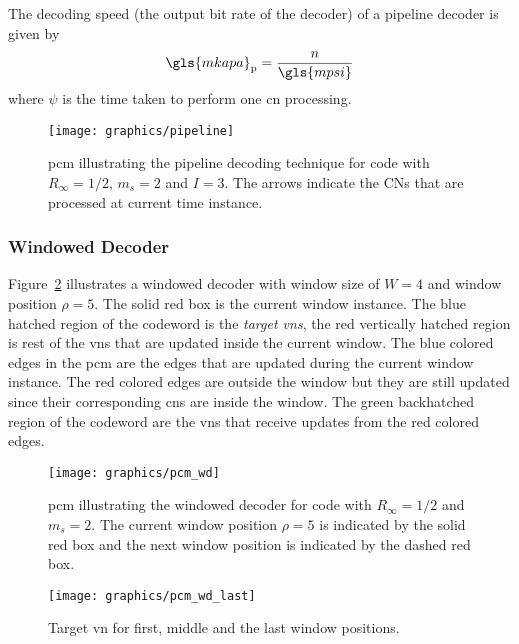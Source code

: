 The decoding speed (the output bit rate of the decoder) of a pipeline decoder is given by
\begin{align}
\gls{mkapa}_{\text{p}}=\frac{n}{\gls{mpsi}}
\end{align}
where $\psi$ is the time taken to perform one \gls{cn} processing.

\begin{figure}[htbp]
  \centering
  \texttt{[image: graphics/pipeline]}
  \caption[Illustration of Pipeline decoder.]{\gls{pcm} illustrating the pipeline decoding technique for code with $R_\infty=1/2$, $m_s=2$ and $I=3$. The arrows indicate the CNs that are processed at current time instance.}
  \label{fig:pipeline}
\end{figure}

\subsubsection{Windowed Decoder}\label{sec:back_wd}
Figure~\ref{fig:wd} illustrates a windowed decoder with window size of $W=4$ and window position $\rho=5$. The solid red box is the current window instance. The blue hatched region of the codeword is the \emph{target \glspl{vn}}, the red vertically hatched region is rest of the \glspl{vn} that are updated inside the current window. The blue colored edges in the \gls{pcm} are the edges that are updated during the current window instance. The red colored edges are outside the window but they are still updated since their corresponding \glspl{cn} are inside the window. The green backhatched region of the codeword are the \glspl{vn} that receive updates from the red colored edges.
\begin{figure}[htbp]
  \centering
  \texttt{[image: graphics/pcm\_wd]}
  \caption[Illustration of windowed decoder.]{\gls{pcm} illustrating the windowed decoder for code with $R_\infty=1/2$ and $m_s=2$. The current window position $\rho=5$ is indicated by the solid red box and the next window position is indicated by the dashed red box.}
  \label{fig:wd}
\end{figure}

\begin{figure}[htbp]
  \centering
  \texttt{[image: graphics/pcm\_wd\_last]}
  \caption{Target \acrshort{vn} for first, middle and the last window positions.}
  \label{fig:wd_last}
\end{figure} 

